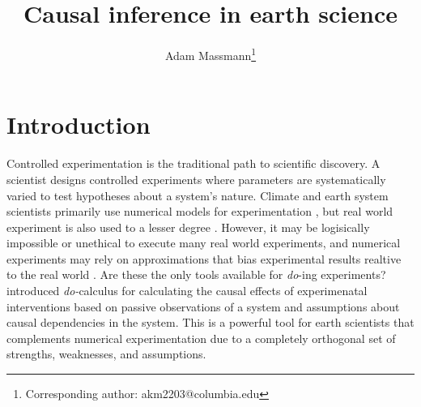 \documentclass[12pt]{article}
\begin{document}
\title{Causal inference in earth science}

\author{Adam Massmann\thanks{Corresponding author: akm2203@columbia.edu}}

\maketitle

\section{Introduction}

Controlled experimentation is the traditional path to scientific
discovery. A scientist designs controlled experiments where parameters
are systematically varied to test hypotheses about a system's
nature. Climate and earth system scientists primarily use numerical
models for experimentation \citep[e.g.,][]{eyring-cmip6-2016}, but
real world experiment is also used to a lesser degree
\citep[e.g.,][]{ainsworth-face-2005}. However, it may be logisically
impossible or unethical to execute many real world experiments, and
numerical experiments may rely on approximations that bias
experimental results realtive to the real world
\citep[e.g.,][]{kim-cmip5,stillmann-cmip5-extremes}. Are these the
only tools available for \textit{do}-ing experiments?
\citet{pearl-1994-do-calculus} introduced \textit{do-}calculus for
calculating the causal effects of experimenatal interventions based on
passive observations of a system and assumptions about causal
dependencies in the system. This is a powerful tool for earth
scientists that complements numerical experimentation due to a
completely orthogonal set of strengths, weaknesses, and assumptions.
\end{document}
